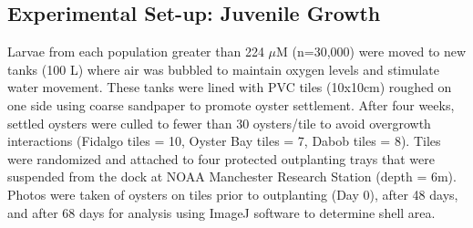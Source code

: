 \documentclass[fleqn,10pt]{wlscirep}
\begin{document}
\subsection*{Experimental Set-up: Juvenile Growth}
Larvae from each population greater than 224 $\mu$M (n=30,000) were moved to new tanks (100 L) where air was bubbled to maintain oxygen levels and stimulate water movement. These tanks were lined with PVC tiles (10x10cm) roughed on one side using coarse sandpaper to promote oyster settlement. After four weeks, settled oysters were culled to fewer than 30 oysters/tile to avoid overgrowth interactions (Fidalgo tiles = 10, Oyster Bay tiles = 7, Dabob tiles = 8). Tiles were randomized and attached to four protected outplanting trays that were suspended from the dock at NOAA Manchester Research Station (depth = 6m). Photos were taken of oysters on tiles prior to outplanting (Day 0), after 48 days, and after 68 days for analysis using ImageJ software to determine shell area. 
\end{document}
